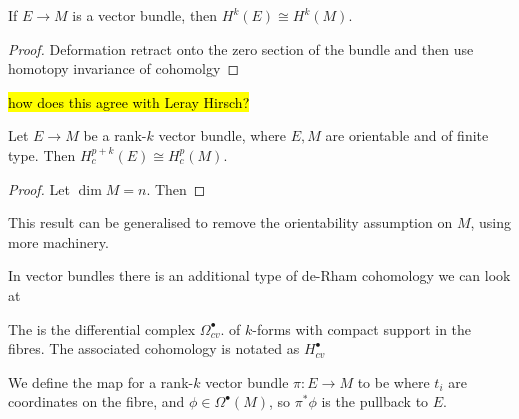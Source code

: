 \documentclass{article}
\begin{document}
\begin{prop}
	If $E\to M$ is a vector bundle, then $	H^k(E) \cong H^k(M)$.
\end{prop}
\begin{proof}
	Deformation retract onto the zero section of the bundle and then use homotopy invariance of cohomolgy
\end{proof}

\begin{remark}
	\hl{how does this agree with Leray Hirsch?}
\end{remark}

\begin{prop}
	Let $E \to M$ be a rank-$k$ vector bundle, where $E,M$ are orientable and of finite type. Then $H_c^{p+k}(E) \cong H^{p}_c(M)$. 
\end{prop}
\begin{proof}
	Let $\dim M = n$. Then 
\end{proof}

\begin{remark}
	This result can be generalised to remove the orientability assumption on $M$, using more machinery. 
\end{remark}

In vector bundles there is an additional type of de-Rham cohomology we can look at 

\begin{definition}
	The  is the differential complex $\Omega_{cv}^\bullet$. of $k$-forms with compact support in the fibres. The associated cohomology is notated as $H^\bullet_{cv}$
\end{definition}

\begin{definition}
	We define the  map for a rank-$k$ vector bundle $\pi: E \to M$ to be 
	where $t_i$ are coordinates on the fibre, and $\phi \in \Omega^\bullet(M)$, so $\pi^\ast \phi$ is the pullback to $E$. 
\end{definition}
\end{document}
